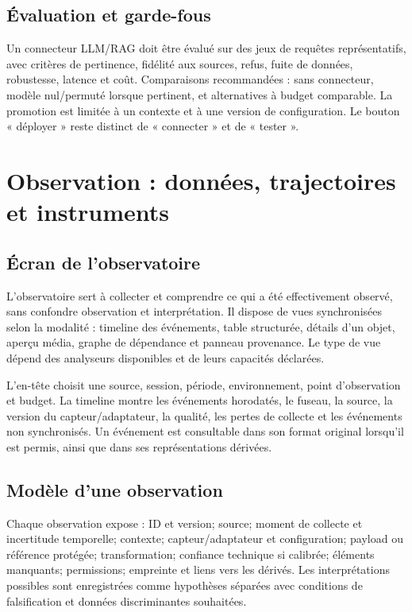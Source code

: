 \documentclass[11pt,a4paper]{article}
\begin{document}
\subsection{Évaluation et garde-fous}
Un connecteur LLM/RAG doit être évalué sur des jeux de requêtes représentatifs, avec critères de pertinence, fidélité aux sources, refus, fuite de données, robustesse, latence et coût. Comparaisons recommandées : sans connecteur, modèle nul/permuté lorsque pertinent, et alternatives à budget comparable. La promotion est limitée à un contexte et à une version de configuration. Le bouton « déployer » reste distinct de « connecter » et de « tester ».

\section{Observation : données, trajectoires et instruments}
\subsection{Écran de l'observatoire}
L'observatoire sert à collecter et comprendre ce qui a été effectivement observé, sans confondre observation et interprétation. Il dispose de vues synchronisées selon la modalité : timeline des événements, table structurée, détails d'un objet, aperçu média, graphe de dépendance et panneau provenance. Le type de vue dépend des analyseurs disponibles et de leurs capacités déclarées.

L'en-tête choisit une source, session, période, environnement, point d'observation et budget. La timeline montre les événements horodatés, le fuseau, la source, la version du capteur/adaptateur, la qualité, les pertes de collecte et les événements non synchronisés. Un événement est consultable dans son format original lorsqu'il est permis, ainsi que dans ses représentations dérivées.

\subsection{Modèle d'une observation}
Chaque observation expose : ID et version; source; moment de collecte et incertitude temporelle; contexte; capteur/adaptateur et configuration; payload ou référence protégée; transformation; confiance technique si calibrée; éléments manquants; permissions; empreinte et liens vers les dérivés. Les interprétations possibles sont enregistrées comme hypothèses séparées avec conditions de falsification et données discriminantes souhaitées.
\end{document}
